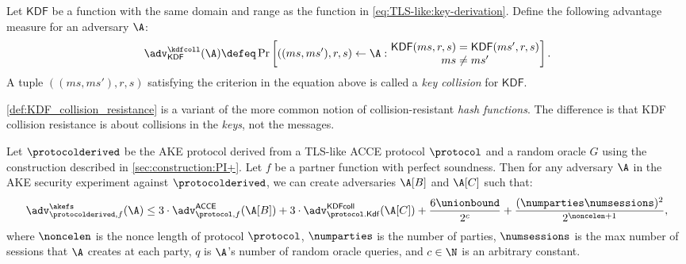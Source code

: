 \begin{definition}\label{def:KDF_collision_resistance}
Let $\mathsf{KDF}$ be a function with the same domain and range as the function in \cref{eq:TLS-like:key-derivation}.
Define the following advantage measure for an adversary $\A$:
\begin{equation*}\label{eq:def:KDF_collision}
	\adv_{\mathsf{KDF}}^{\kdfcoll}(\A) 
		\defeq \Pr \left[ ((ms,ms'), r,s) \gets \A :
				\parbox{13.5em}{\centering
					$\mathsf{KDF}(ms, r,s) = \mathsf{KDF}(ms', r,s)$ \\
					$ms \neq ms'$
				}
			\right] .
\end{equation*}
A tuple $((ms,ms'),r,s)$ satisfying the criterion in the equation above is called a \emph{key collision} for $\mathsf{KDF}$.
\end{definition}

\begin{remark}\label{remark:EAP-TLS:def:KDF_key_collision}
\cref{def:KDF_collision_resistance} is a variant of the more common notion of collision-resistant \emph{hash functions}.
The difference is that KDF collision resistance is about collisions in the \emph{keys},
not the messages. 
\end{remark}





\begin{theorem}\label{thm:AKE_from_TLS-like_ACCE_protocol_main_result}
Let $\protocolderived$ be the AKE protocol derived from a TLS-like ACCE protocol $\protocol$ and a random oracle $G$
using the construction described in \cref{sec:construction:PI+}.
Let $f$ be a partner function with perfect soundness.
Then for any adversary $\A$ in the AKE security experiment against $\protocolderived$,
we can create adversaries $\A[B]$ and $\A[C]$ such that:
\begin{equation}
	\adv_{\protocolderived,f}^{\akefs}(\A)
		\leq 3 \cdot \adv_{\protocol,f}^{\operatorname{\mathsf{ACCE}}}(\A[B])
		+ 3 \cdot \adv_{\protocol.\mathsf{Kdf}}^{\mathsf{KDFcoll}}(\A[C])
		+ \frac{6 \unionbound}{2^{c}}
		+ \frac{(\numparties \numsessions)^2 }{2^{\noncelen+1}},
\end{equation}
where $\noncelen$ is the nonce length of protocol $\protocol$,
$\numparties$ is the number of parties,
$\numsessions$ is the max number of sessions that $\A$ creates at each party,
$q$ is $\A$'s number of random oracle queries,
and $c \in \N$ is an arbitrary constant.
\end{theorem}

